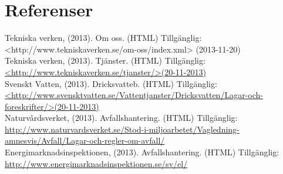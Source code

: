 \documentclass[10pt,a4paper]{article}
\begin{document}
\section{Referenser}
Tekniska verken, (2013). Om oss. (HTML) Tillgänglig: \newline
<http://www.tekniskaverken.se/om-oss/index.xml> (2013-11-20)\\
Tekniska verken, (2013). Tjänster. (HTML) Tillgänglig: \\
\hyperref{http://www.tekniskaverken.se/tjanster/}{}{}{<http://www.tekniskaverken.se/tjanster/>(20-11-2013)}\\
Svenskt Vatten, (2013). Dricksvatteb. (HTML) Tillgänglig: \\
\hyperref{http://www.svensktvatten.se/Vattentjanster/Dricksvatten/Lagar-och-foreskrifter/}{}{}{<http://www.svensktvatten.se/Vattentjanster/Dricksvatten/Lagar-och-foreskrifter/>(20-11-2013)}\\
Naturvårdsverket, (2013). Avfallshantering. (HTML) Tillgänglig: \\
\hyperref{http://www.naturvardsverket.se/Stod-i-miljoarbetet/Vagledning-amnesvis/Avfall/Lagar-och-regler-om-avfall/}{}{}{http://www.naturvardsverket.se/Stod-i-miljoarbetet/Vagledning-amnesvis/Avfall/Lagar-och-regler-om-avfall/}\\
Energimarknadsinspektionen, (2013). Avfallshantering. (HTML) Tillgänglig: \\
\hyperref{http://www.energimarknadsinspektionen.se/sv/el/}{}{}{http://www.energimarknadsinspektionen.se/sv/el/}\\
\end{document}

